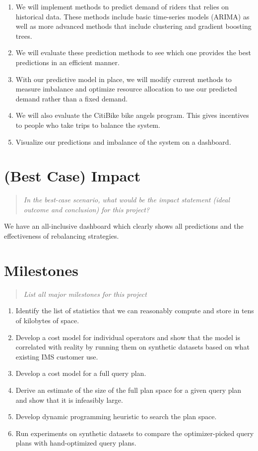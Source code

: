\documentclass{proc}
\begin{document}
\begin{enumerate}
\item We will implement methods to predict demand of riders that relies on historical data. These methods include basic time-series models (ARIMA) as well as more advanced methods that include clustering and gradient boosting trees. 
\item We will evaluate these prediction methods to see which one provides the best predictions in an efficient manner.
\item With our predictive model in place, we will modify current methods to measure imbalance and optimize resource allocation to use our predicted demand rather than a fixed demand. 
\item We will also evaluate the CitiBike bike angels program. This gives incentives to people who take trips to balance the system. 
\item Visualize our predictions and imbalance of the system on a dashboard. 
\end{enumerate}

\section{(Best Case) Impact}
\begin{quote}
\emph{In the best-case scenario, what would be the impact statement (ideal outcome and conclusion) for this project?} 
\end{quote}

We have an all-inclusive dashboard which clearly shows all predictions and the effectiveness of rebalancing strategies. 

\section{Milestones}
\begin{quote}
\emph{List all major milestones for this project}
\end{quote}

\begin{enumerate}
  \item Identify the list of statistics that we can reasonably compute and store in tens of kilobytes of space.
  \item Develop a cost model for individual operators and show that the model is correlated with reality by running them on synthetic datasets based on what existing IMS customer use.
  \item Develop a cost model for a full query plan.
  \item Derive an estimate of the size of the full plan space for a given query plan and show that it is infeasibly large.
  \item Develop dynamic programming heuristic to search the plan space.
  \item Run experiments on synthetic datasets to compare the optimizer-picked query plans with hand-optimized query plans.
\end{enumerate}
\end{document}
